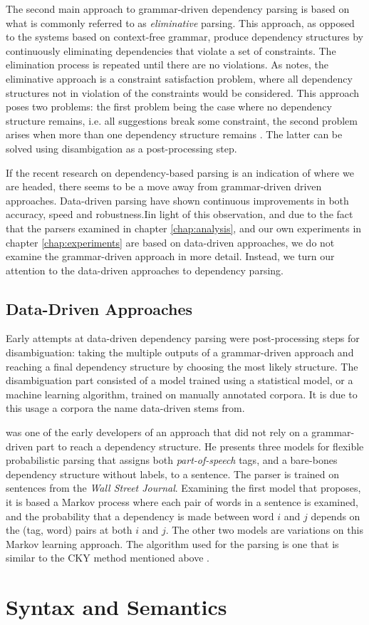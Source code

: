 The second main approach to grammar-driven dependency parsing is based on what is commonly referred to as \textit{eliminative} parsing. This approach, as opposed to the systems based on context-free grammar, produce dependency structures by continuously eliminating dependencies that violate a set of constraints. The elimination process is repeated until there are no violations. As \citeauthor{Niv:05} notes, the eliminative approach is a constraint satisfaction problem, where all dependency structures not in violation of the constraints would be considered. This approach poses two problems: the first problem being the case where no dependency structure remains, i.e. all suggestions break some constraint, the second problem arises when more than one dependency structure remains \cite{Niv:05}. The latter can be solved using disambigation as a post-processing step.

If the recent research on dependency-based parsing is an indication of where we are headed, there seems to be a move away from grammar-driven driven approaches. Data-driven parsing have shown continuous improvements in both accuracy, speed and robustness.Iin light of this observation, and due to the fact that the parsers examined in chapter \ref{chap:analysis}, and our own experiments in chapter \ref{chap:experiments} are based on data-driven approaches, we do not examine the grammar-driven approach in more detail. Instead, we turn our attention to the data-driven approaches to dependency parsing.

\subsection{Data-Driven Approaches}
\label{data-driven}

Early attempts at data-driven dependency parsing were post-processing steps for disambiguation: taking the multiple outputs of a grammar-driven approach and reaching a final dependency structure by choosing the most likely structure. The disambiguation part consisted of a model trained using a statistical model, or a machine learning algorithm, trained on manually annotated corpora. It is due to this usage a corpora the name data-driven stems from.


\citeauthor{Eisner:96a} was one of the early developers of an approach that did not rely on a grammar-driven part to reach a dependency structure. He presents three models for flexible probabilistic parsing that assigns both \textit{part-of-speech} tags, and a bare-bones dependency structure without labels, to a sentence. The parser is trained on sentences from the \textit{Wall Street Journal}. Examining the first model that \citeauthor{Eisner:96a} proposes, it is based a Markov process where each pair of words in a sentence is examined, and the probability that a dependency is made between word $i$ and $j$ depends on the (tag, word) pairs at both $i$ and $j$. The other two models are variations on this Markov learning approach. The algorithm used for the parsing is one that is similar to the CKY method mentioned above \cite{Eisner:96a}.


\section{Syntax and Semantics}
\label{syntactic-semantic}